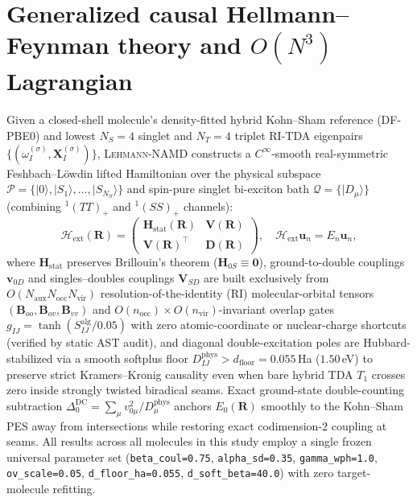 \documentclass[10pt,twocolumn]{article}
\theoremstyle{natthm}
\newcommand{\leh}{\textsc{Lehmann-NAMD}}
\newcommand{\Hext}{\mathcal{H}_{\mathrm{ext}}}
\begin{document}
\section*{Generalized causal Hellmann--Feynman theory and $O(N^3)$ Lagrangian}
Given a closed-shell molecule's density-fitted hybrid Kohn--Sham reference (DF-PBE0\cite{adamo1999pbe0}) and lowest $N_S=4$ singlet and $N_T=4$ triplet RI-TDA eigenpairs $\{(\omega_I^{(\sigma)},\mathbf{X}_I^{(\sigma)})\}$, \leh{} constructs a $C^\infty$-smooth real-symmetric Feshbach--L\"owdin lifted Hamiltonian over the physical subspace $\mathcal{P}=\{|0\rangle,|S_1\rangle,\dots,|S_{N_S}\rangle\}$ and spin-pure singlet bi-exciton bath $\mathcal{Q}=\{|D_\mu\rangle\}$ (combining $^1(TT)_+$ and $^1(SS)_+$ channels):
\begin{equation}
  \Hext(\mathbf{R}) =
  \begin{pmatrix}
    \mathbf{H}_{\mathrm{stat}}(\mathbf{R}) & \mathbf{V}(\mathbf{R}) \\
    \mathbf{V}(\mathbf{R})^\top & \mathbf{D}(\mathbf{R})
  \end{pmatrix}, \quad
  \Hext\mathbf{u}_n = E_n\mathbf{u}_n,
  \label{eq:hext}
\end{equation}
where $\mathbf{H}_{\mathrm{stat}}$ preserves Brillouin's theorem ($\mathbf{H}_{0S}\equiv\mathbf{0}$), ground-to-double couplings $\mathbf{v}_{0D}$ and singles--doubles couplings $\mathbf{V}_{SD}$ are built exclusively from $O(N_{\mathrm{aux}}N_{\mathrm{occ}}N_{\mathrm{vir}})$ resolution-of-the-identity (RI) molecular-orbital tensors $(\mathbf{B}_{oo},\mathbf{B}_{ov},\mathbf{B}_{vv})$ and $O(n_{\mathrm{occ}})\times O(n_{\mathrm{vir}})$-invariant overlap gates $g_{IJ}=\tanh(S_{IJ}^{\mathrm{alg}}/0.05)$ with zero atomic-coordinate or nuclear-charge shortcuts (verified by static AST audit), and diagonal double-excitation poles are Hubbard-stabilized via a smooth softplus floor $D_{IJ}^{\mathrm{phys}}>d_{\mathrm{floor}}=0.055$\,Ha ($1.50$\,eV) to preserve strict Kramers--Kronig causality even when bare hybrid TDA $T_1$ crosses zero inside strongly twisted biradical seams.
Exact ground-state double-counting subtraction $\Delta_0^{\mathrm{DC}}=\sum_\mu v_{0\mu}^2/D_\mu^{\mathrm{phys}}$ anchors $E_0(\mathbf{R})$ smoothly to the Kohn--Sham PES away from intersections while restoring exact codimension-2 coupling at seams.
All results across all molecules in this study employ a single frozen universal parameter set (\texttt{beta\_coul=0.75}, \texttt{alpha\_sd=0.35}, \texttt{gamma\_wph=1.0}, \texttt{ov\_scale=0.05}, \texttt{d\_floor\_ha=0.055}, \texttt{d\_soft\_beta=40.0}) with zero target-molecule refitting.
\end{document}
